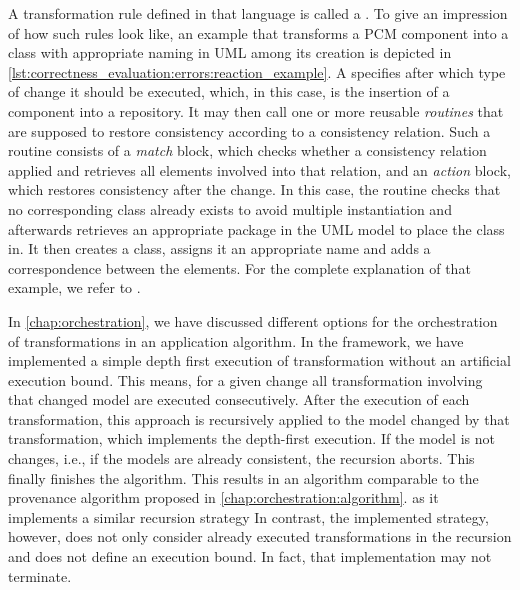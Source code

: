 

A transformation rule defined in that language is called a \emph{\reaction}.
To give an impression of how such rules look like, an example that transforms a \gls{PCM} component into a class with appropriate naming in \gls{UML} among its creation is depicted in \autoref{lst:correctness_evaluation:errors:reaction_example}.
A \reaction specifies after which type of change it should be executed, which, in this case, is the insertion of a component into a repository.
It may then call one or more reusable \emph{routines} that are supposed to restore consistency according to a consistency relation.
Such a routine consists of a \emph{match} block, which checks whether a consistency relation applied and retrieves all elements involved into that relation, and an \emph{action} block, which restores consistency after the change.
In this case, the routine checks that no corresponding class already exists to avoid multiple instantiation and afterwards retrieves an appropriate package in the \gls{UML} model to place the class in.
It then creates a class, assigns it an appropriate name and adds a correspondence between the elements.
For the complete explanation of that example, we refer to \cite{klare2020Vitruv-JSS}.

In \autoref{chap:orchestration}, we have discussed different options for the orchestration of transformations in an application algorithm.
In the \vitruv framework, we have implemented a simple depth first execution of transformation without an artificial execution bound.
This means, for a given change all transformation involving that changed model are executed consecutively.
After the execution of each transformation, this approach is recursively applied to the model changed by that transformation, which implements the depth-first execution.
If the model is not changes, i.e., if the models are already consistent, the recursion aborts.
This finally finishes the algorithm.
This results in an algorithm comparable to the provenance algorithm proposed in \autoref{chap:orchestration:algorithm}. as it implements a similar recursion strategy
In contrast, the implemented strategy, however, does not only consider already executed transformations in the recursion and does not define an execution bound.
In fact, that implementation may not terminate.

